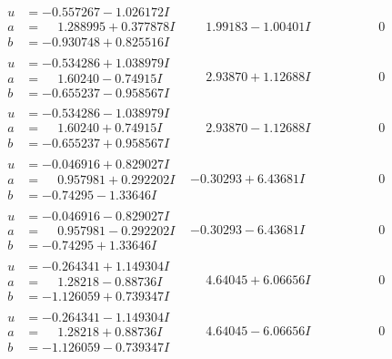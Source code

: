 \documentclass[1p]{elsarticle_modified}
\theoremstyle{definition}
\begin{document}
$$\begin{array}{c|c|c}
\begin{aligned}
u &= -0.557267 - 1.026172 I \\
a &= \phantom{-}1.288995 + 0.377878 I \\
b &= -0.930748 + 0.825516 I\end{aligned}
 & \phantom{-}1.99183 - 1.00401 I & \phantom{-0.000000 } 0 \\ \hline\begin{aligned}
u &= -0.534286 + 1.038979 I \\
a &= \phantom{-}1.60240 - 0.74915 I \\
b &= -0.655237 - 0.958567 I\end{aligned}
 & \phantom{-}2.93870 + 1.12688 I & \phantom{-0.000000 } 0 \\ \hline\begin{aligned}
u &= -0.534286 - 1.038979 I \\
a &= \phantom{-}1.60240 + 0.74915 I \\
b &= -0.655237 + 0.958567 I\end{aligned}
 & \phantom{-}2.93870 - 1.12688 I & \phantom{-0.000000 } 0 \\ \hline\begin{aligned}
u &= -0.046916 + 0.829027 I \\
a &= \phantom{-}0.957981 + 0.292202 I \\
b &= -0.74295 - 1.33646 I\end{aligned}
 & -0.30293 + 6.43681 I & \phantom{-0.000000 } 0 \\ \hline\begin{aligned}
u &= -0.046916 - 0.829027 I \\
a &= \phantom{-}0.957981 - 0.292202 I \\
b &= -0.74295 + 1.33646 I\end{aligned}
 & -0.30293 - 6.43681 I & \phantom{-0.000000 } 0 \\ \hline\begin{aligned}
u &= -0.264341 + 1.149304 I \\
a &= \phantom{-}1.28218 - 0.88736 I \\
b &= -1.126059 + 0.739347 I\end{aligned}
 & \phantom{-}4.64045 + 6.06656 I & \phantom{-0.000000 } 0 \\ \hline\begin{aligned}
u &= -0.264341 - 1.149304 I \\
a &= \phantom{-}1.28218 + 0.88736 I \\
b &= -1.126059 - 0.739347 I\end{aligned}
 & \phantom{-}4.64045 - 6.06656 I & \phantom{-0.000000 } 0 \\ \hline\begin{aligned}

\end{aligned}
\end{array}$$
\end{document}
